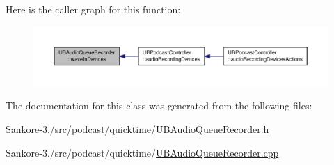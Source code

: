 Here is the caller graph for this function\-:
\nopagebreak
\begin{figure}[H]
\begin{center}
\leavevmode
\includegraphics[width=350pt]{de/d2b/class_u_b_audio_queue_recorder_a3aefba29bf7b27d3fc8acbf116d24f42_icgraph}
\end{center}
\end{figure}




The documentation for this class was generated from the following files\-:\begin{DoxyCompactItemize}
\item 
Sankore-\/3./src/podcast/quicktime/\hyperlink{_u_b_audio_queue_recorder_8h}{U\-B\-Audio\-Queue\-Recorder.\-h}\item 
Sankore-\/3./src/podcast/quicktime/\hyperlink{_u_b_audio_queue_recorder_8cpp}{U\-B\-Audio\-Queue\-Recorder.\-cpp}\end{DoxyCompactItemize}
